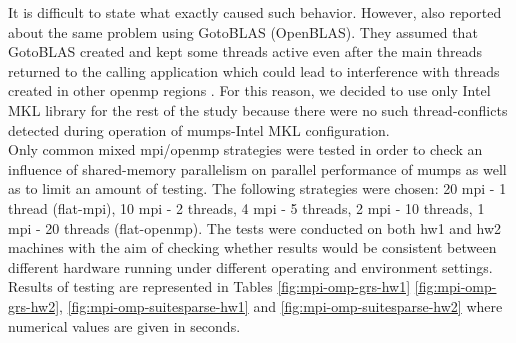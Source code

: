 It is difficult to state what exactly caused such behavior. However, \citeauthor{chowdhury2010some} also reported about the same problem using GotoBLAS (OpenBLAS). They assumed that GotoBLAS created and kept some threads active even after the main threads returned to the calling application which could lead to interference with threads created in other \acrshort{openmp} regions \cite{chowdhury2010some}. For this reason, we decided to use only Intel MKL library for the rest of the study because there were no such thread-conflicts detected during operation of \acrshort{mumps}-Intel MKL configuration.\\


Only common mixed \acrshort{mpi}/\acrshort{openmp} strategies were tested in order to check an influence of shared-memory parallelism on parallel performance of \acrshort{mumps} as well as to limit an amount of testing. The following strategies were chosen: 20 \acrshort{mpi} - 1 thread (flat-\acrshort{mpi}), 10 \acrshort{mpi} - 2 threads, 4 \acrshort{mpi} - 5 threads, 2 \acrshort{mpi} - 10 threads, 1 \acrshort{mpi} - 20 threads (flat-\acrshort{openmp}). The tests were conducted on both \gls{hw1} and \gls{hw2} machines with the aim of checking whether  results would be consistent between different hardware running under different operating and environment settings. Results of testing are represented in Tables \ref{fig:mpi-omp-grs-hw1} \ref{fig:mpi-omp-grs-hw2}, \ref{fig:mpi-omp-suitesparse-hw1} and \ref{fig:mpi-omp-suitesparse-hw2} where numerical values are given in seconds.\\


